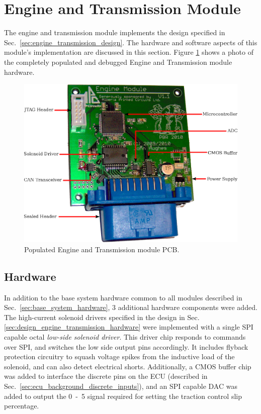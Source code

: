 \section{Engine and Transmission Module}

The engine and transmission module implements the design specified in Sec.\ \ref{sec:engine_transmission_design}. The hardware and software aspects of this module's implementation are discussed in this section. Figure \ref{fig:engine_transmission_pcb} shows a photo of the completely populated and debugged Engine and Transmission module hardware.

\begin{figure}[H]
\centering
\includegraphics[scale=1]{implementation/figures/engine_transmission_pcb}
\caption{Populated Engine and Transmission module PCB.}
\label{fig:engine_transmission_pcb}
\end{figure}

\subsection{Hardware}

In addition to the base system hardware common to all modules described in Sec.\ \ref{sec:base_system_hardware}, 3 additional hardware components were added. The high-current solenoid drivers specified in the design in Sec. \ref{sec:design_engine_transmission_hardware} were implemented with a single SPI capable octal \emph{low-side solenoid driver}. This driver chip responds to commands over SPI, and switches the low side output pins accordingly. It includes flyback protection circuitry to squash voltage spikes from the inductive load of the solenoid, and can also detect electrical shorts. Additionally, a CMOS buffer chip was added to interface the discrete pins on the ECU (described in Sec.\ \ref{sec:ecu_background_discrete_inputs}), and an SPI capable DAC was added to output the \unit{0-5}{\volt} signal required for setting the traction control slip percentage.

